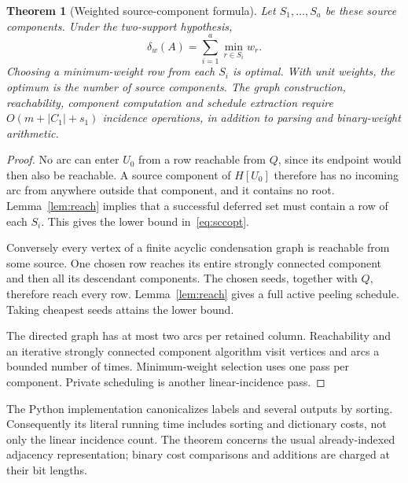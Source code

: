 \documentclass[11pt]{article}
\newtheorem{theorem}{Theorem}[section]
\theoremstyle{definition}\newtheorem{definition}[theorem]{Definition}
\theoremstyle{remark}\newtheorem{remark}[theorem]{Remark}
\begin{document}
\begin{theorem}[Weighted source-component formula]
\label{thm:scc}
Let $S_1,\ldots,S_a$ be these source components. Under the two-support hypothesis,
\begin{equation}
 \delta_w(A)=\sum_{i=1}^a\min_{r\in S_i}w_r.
 \label{eq:sccopt}
\end{equation}
Choosing a minimum-weight row from each $S_i$ is optimal. With unit weights, the optimum is the number of source components. The graph construction, reachability, component computation and schedule extraction require $O(m+|C_1|+s_1)$ incidence operations, in addition to parsing and binary-weight arithmetic.
\end{theorem}
\begin{proof}
No arc can enter $U_0$ from a row reachable from $Q$, since its endpoint would then also be reachable. A source component of $H[U_0]$ therefore has no incoming arc from anywhere outside that component, and it contains no root. Lemma~\ref{lem:reach} implies that a successful deferred set must contain a row of each $S_i$. This gives the lower bound in~\eqref{eq:sccopt}.

Conversely every vertex of a finite acyclic condensation graph is reachable from some source. One chosen row reaches its entire strongly connected component and then all its descendant components. The chosen seeds, together with $Q$, therefore reach every row. Lemma~\ref{lem:reach} gives a full active peeling schedule. Taking cheapest seeds attains the lower bound.

The directed graph has at most two arcs per retained column. Reachability and an iterative strongly connected component algorithm visit vertices and arcs a bounded number of times. Minimum-weight selection uses one pass per component. Private scheduling is another linear-incidence pass.
\end{proof}

The Python implementation canonicalizes labels and several outputs by sorting. Consequently its literal running time includes sorting and dictionary costs, not only the linear incidence count. The theorem concerns the usual already-indexed adjacency representation; binary cost comparisons and additions are charged at their bit lengths.
\end{document}

